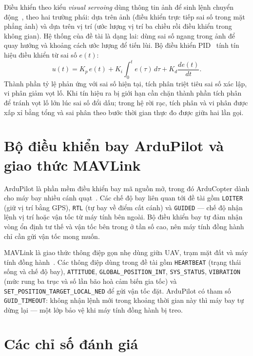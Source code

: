 Điều khiển theo kiểu \textit{visual servoing} dùng thông tin ảnh để sinh lệnh chuyển động~\cite{chaumette2006visual}, theo hai trường phái: dựa trên ảnh (điều khiển trực tiếp sai số trong mặt phẳng ảnh) và dựa trên vị trí (ước lượng vị trí ba chiều rồi điều khiển trong không gian). Hệ thống của đề tài là dạng lai: dùng sai số ngang trong ảnh để quay hướng và khoảng cách ước lượng để tiến lùi. Bộ điều khiển PID~\cite{astrom2008feedback} tính tín hiệu điều khiển từ sai số $e(t)$:
\begin{equation}
u(t) = K_p\, e(t) + K_i \int_0^t e(\tau)\, d\tau + K_d \frac{de(t)}{dt}.
\label{eq:pid}
\end{equation}
Thành phần tỷ lệ phản ứng với sai số hiện tại, tích phân triệt tiêu sai số xác lập, vi phân giảm vọt lố. Khi tín hiệu ra bị giới hạn cần chặn thành phần tích phân để tránh vọt lố lớn lúc sai số đổi dấu; trong hệ rời rạc, tích phân và vi phân được xấp xỉ bằng tổng và sai phân theo bước thời gian thực đo được giữa hai lần gọi.

\section{Bộ điều khiển bay ArduPilot và giao thức MAVLink}

ArduPilot là phần mềm điều khiển bay mã nguồn mở, trong đó ArduCopter dành cho máy bay nhiều cánh quạt~\cite{ardupilot}. Các chế độ bay liên quan tới đề tài gồm \texttt{LOITER} (giữ vị trí bằng GPS), \texttt{RTL} (tự bay về điểm cất cánh) và \texttt{GUIDED} --- chế độ nhận lệnh vị trí hoặc vận tốc từ máy tính bên ngoài. Bộ điều khiển bay tự đảm nhận vòng ổn định tư thế và vận tốc bên trong ở tần số cao, nên máy tính đồng hành chỉ cần gửi vận tốc mong muốn.

MAVLink là giao thức thông điệp gọn nhẹ dùng giữa UAV, trạm mặt đất và máy tính đồng hành~\cite{koubaa2019mavlink}. Các thông điệp dùng trong đề tài gồm \texttt{HEARTBEAT} (trạng thái sống và chế độ bay), \texttt{ATTITUDE}, \texttt{GLOBAL\_POSITION\_INT}, \texttt{SYS\_STATUS}, \texttt{VIBRATION} (mức rung ba trục và số lần bão hoà cảm biến gia tốc) và \texttt{SET\_POSITION\_TARGET\_LOCAL\_NED} để gửi vận tốc đặt. ArduPilot có tham số \texttt{GUID\_TIMEOUT}: không nhận lệnh mới trong khoảng thời gian này thì máy bay tự dừng lại --- một lớp bảo vệ khi máy tính đồng hành bị treo.

\section{Các chỉ số đánh giá}
\label{sec:chiso}

